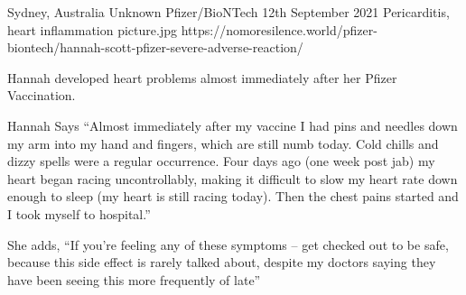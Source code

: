 {Sydney, Australia}
{Unknown}
{Pfizer/BioNTech}
{12th September 2021}
{Pericarditis, heart inflammation}
{picture.jpg}
{https://nomoresilence.world/pfizer-biontech/hannah-scott-pfizer-severe-adverse-reaction/}
{

Hannah developed heart problems almost immediately after her Pfizer Vaccination.

Hannah Says “Almost immediately after my vaccine I had pins and needles down my
arm into my hand and fingers, which are still numb today. Cold chills and dizzy
spells were a regular occurrence. Four days ago (one week post jab) my heart
began racing uncontrollably, making it difficult to slow my heart rate down
enough to sleep (my heart is still racing today). Then the chest pains started
and I took myself to hospital.”

She adds, “If you’re feeling any of these symptoms – get checked out to be safe,
because this side effect is rarely talked about, despite my doctors saying they
have been seeing this more frequently of late”

}
